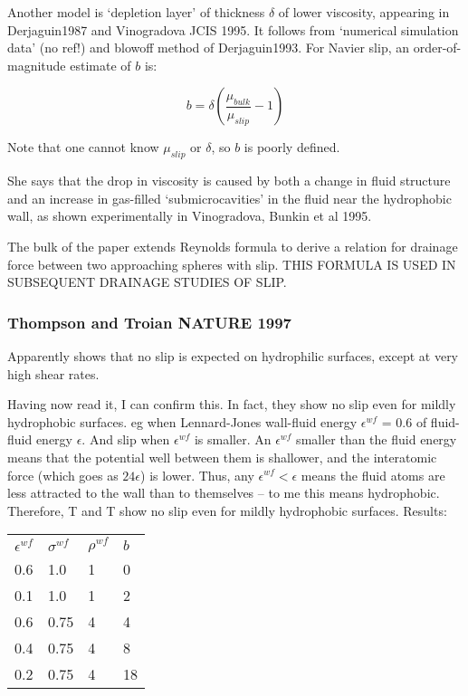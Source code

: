 \documentclass[twocolumn]{article}
\begin{document}
Another model is `depletion layer' of thickness $ \delta $ of lower viscosity, appearing in Derjaguin1987 and Vinogradova JCIS 1995. It follows from `numerical simulation data' (no ref!) and blowoff method of Derjaguin1993.  For Navier slip, an order-of-magnitude estimate of $b$ is:

 \[ b = \delta \left( \frac{\mu_{bulk}}{\mu_{slip}} - 1 \right) \]

Note that one cannot know $ \mu_{slip} $ or $ \delta $, so $b$ is poorly defined.

She says that the drop in viscosity is caused by both a change in fluid structure and an increase in gas-filled `submicrocavities' in the fluid near the hydrophobic wall, as shown experimentally in Vinogradova, Bunkin et al 1995.

The bulk of the paper extends Reynolds formula to derive a relation for drainage force between two approaching spheres with slip.  THIS FORMULA IS USED IN SUBSEQUENT DRAINAGE STUDIES OF SLIP.

\subsubsection*{Thompson and Troian NATURE 1997}
Apparently shows that no slip is expected on hydrophilic surfaces, except at very high shear rates.

Having now read it, I can confirm this. In fact, they show no slip even for mildly hydrophobic surfaces. eg when Lennard-Jones wall-fluid energy $\epsilon^{wf}$ = 0.6 of fluid-fluid energy $\epsilon$. And slip when $\epsilon^{wf}$ is smaller. An $\epsilon^{wf}$ smaller than the fluid energy means that the potential well between them is shallower, and the interatomic force (which goes as $24\epsilon$) is lower. Thus, any $\epsilon^{wf} < \epsilon$ means the fluid atoms are less attracted to the wall than to themselves -- to me this means hydrophobic. Therefore, T and T show no slip even for mildly hydrophobic surfaces. Results:
\vspace*{1em}

 \begin{tabular}{l l l l }
$\epsilon^{wf}$ & $\sigma^{wf}$ & $\rho^{wf}$ & $b$ \\
0.6                    & 1.0                  & 1                  & 0    \\
0.1                    & 1.0                  & 1                  & 2    \\
0.6                    & 0.75                & 4                  & 4    \\
0.4                    & 0.75                & 4                  & 8    \\
0.2                    & 0.75                & 4                  & 18   \\
\end{tabular}
\end{document}

